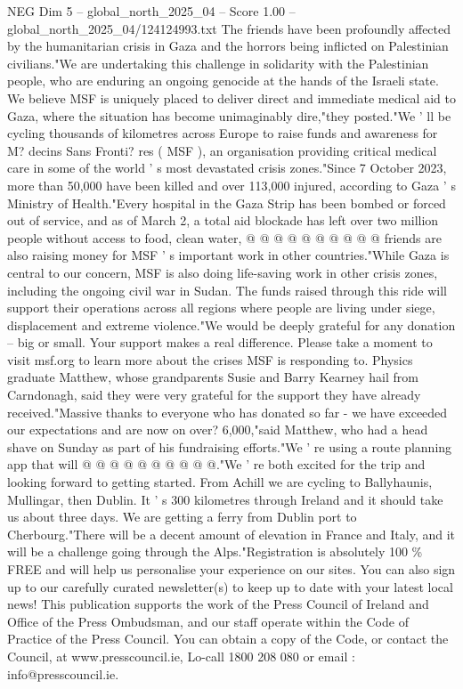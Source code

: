 \begin{textsample}{NEG Dim 5 – global\_north\_2025\_04 – Score 1.00 – global\_north\_2025\_04/124124993.txt}  \label{ex:f5_neg_369}
The friends have been profoundly affected by the humanitarian crisis in Gaza and the horrors being inflicted on Palestinian civilians."We are undertaking this challenge in solidarity with the Palestinian people, who are enduring an ongoing genocide at the hands of the Israeli state.
We believe MSF is uniquely placed to deliver direct and immediate medical aid to Gaza, where the situation has become unimaginably dire,"they posted."We ' ll be cycling thousands of kilometres across Europe to raise funds and awareness for M? decins Sans Fronti? res ( MSF ), an organisation providing critical medical care in some of the world ' s most devastated crisis zones."Since 7 October 2023, more than 50,000 have been killed and over 113,000 injured, according to Gaza ' s Ministry of Health."Every hospital in the Gaza Strip has been bombed or forced out of service, and as of March 2, a total aid blockade has left over two million people without access to food, clean water, @ @ @ @ @ @ @ @ @ @ friends are also raising money for MSF ' s important work in other countries."While Gaza is central to our concern, MSF is also doing life-saving work in other crisis zones, including the ongoing civil war in Sudan.
The funds raised through this ride will support their operations across all regions where people are living under siege, displacement and extreme violence."We would be deeply grateful for any donation -- big or small.
Your support makes a real difference.
Please take a moment to visit msf.org to learn more about the crises MSF is responding to.
Physics graduate Matthew, whose grandparents Susie and Barry Kearney hail from Carndonagh, said they were very grateful for the support they have already received."Massive thanks to everyone who has donated so far - we have exceeded our expectations and are now on over? 6,000,"said Matthew, who had a head shave on Sunday as part of his fundraising efforts."We ' re using a route planning app that will @ @ @ @ @ @ @ @ @ @."We ' re both excited for the trip and looking forward to getting started.
From Achill we are cycling to Ballyhaunis, Mullingar, then Dublin.
It ' s 300 kilometres through Ireland and it should take us about three days.
We are getting a ferry from Dublin port to Cherbourg."There will be a decent amount of elevation in France and Italy, and it will be a challenge going through the Alps."Registration is absolutely 100 \% FREE and will help us personalise your experience on our sites.
You can also sign up to our carefully curated newsletter(s) to keep up to date with your latest local news!
This publication supports the work of the Press Council of Ireland and Office of the Press Ombudsman, and our staff operate within the Code of Practice of the Press Council.
You can obtain a copy of the Code, or contact the Council, at www.presscouncil.ie, Lo-call 1800 208 080 or email : info@presscouncil.ie.

\end{textsample}
